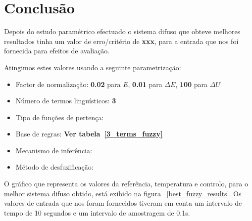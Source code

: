 \documentclass{article}
\begin{document}
\clearpage
\section{Conclusão}
\indent \indent Depois do estudo paramétrico efectuado o sistema difuso que obteve melhores resultados tinha um valor de erro/critério de \textbf{xxx}, para a entrada que nos foi fornecida para efeitos de avaliação.

Atingimos estes valores usando a seguinte parametrização:
\begin{itemize}
\item Factor de normalização: \textbf{0.02} para $E$, \textbf{0.01} para $\Delta E$, \textbf{100} para $\Delta U$
\item Número de termos linguísticos: \textbf{3}
\item Tipo de funções de pertença: %
\item Base de regras: \textbf{Ver tabela~\ref{3_terms_fuzzy}}
\item Mecanismo de inferência: %
\item Método de desfuzificação: %
\end{itemize}

O gráfico que representa os valores da referência, temperatura e controlo, para o melhor sistema difuso obtido, está exibido na figura ~\ref{best_fuzzy_results}. Os valores de entrada que nos foram fornecidos tiveram em conta um intervalo de tempo de 10 segundos e um intervalo de amostragem de 0.1s.

\end{document}
